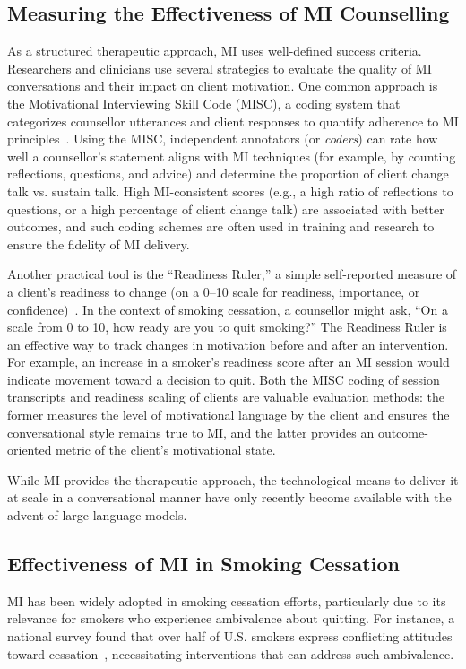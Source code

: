 \subsection*{Measuring the Effectiveness of MI Counselling}
As a structured therapeutic approach, MI uses well-defined success criteria. Researchers and clinicians use several strategies to evaluate the quality of MI conversations and their impact on client motivation. One common approach is the Motivational Interviewing Skill Code (MISC), a coding system that categorizes counsellor utterances and client responses to quantify adherence to MI principles~\cite{Houck2010}. Using the MISC, independent annotators (or \emph{coders}) can rate how well a counsellor's statement aligns with MI techniques (for example, by counting reflections, questions, and advice) and determine the proportion of client change talk vs. sustain talk. High MI-consistent scores (e.g., a high ratio of reflections to questions, or a high percentage of client change talk) are associated with better outcomes, and such coding schemes are often used in training and research to ensure the fidelity of MI delivery.

Another practical tool is the ``Readiness Ruler,'' a simple self-reported measure of a client’s readiness to change (on a 0–10 scale for readiness, importance, or confidence)~\cite{Boudreaux2012}. In the context of smoking cessation, a counsellor might ask, ``On a scale from 0 to 10, how ready are you to quit smoking?'' The Readiness Ruler is an effective way to track changes in motivation before and after an intervention. For example, an increase in a smoker's readiness score after an MI session would indicate movement toward a decision to quit. Both the MISC coding of session transcripts and readiness scaling of clients are valuable evaluation methods: the former measures the level of motivational language by the client and ensures the conversational style remains true to MI, and the latter provides an outcome-oriented metric of the client’s motivational state.

While MI provides the therapeutic approach, the technological means to deliver it at scale in a conversational manner have only recently become available with the advent of large language models.

\subsection{Effectiveness of MI in Smoking Cessation}
MI has been widely adopted in smoking cessation efforts, particularly due to its relevance for smokers who experience ambivalence about quitting. For instance, a national survey found that over half of U.S. smokers express conflicting attitudes toward cessation~\cite{Babb2017}, necessitating interventions that can address such ambivalence.

